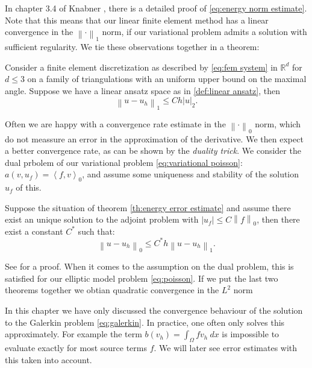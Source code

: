 \documentclass[../Main/main.tex]{subfiles}
\begin{document}
	In chapter 3.4 of Knabner \cite{Knabner}, there is a detailed proof of \eqref{eq:energy norm estimate}.\\
	Note that this means that our linear finite element method has a linear convergence in the $\left \| \cdot \right \|_1$ norm, if our variational problem admits a solution with sufficient regularity. We tie these observations together in a theorem:
	\begin{theorem}\label{th:energy error estimate}
		Consider a finite element discretization as described by \eqref{eq:fem system} in $\mathbb{R}^d$ for $d\leq 3$ on a family of triangulations with an uniform upper bound on the maximal angle. Suppose we have a linear ansatz space as in \ref{def:linear ansatz}, then
		\begin{equation}
			\left \| u-u_h \right \|_{1}\leq C h|u|_{2}.
		\end{equation}
	\end{theorem}
	Often we are happy with a convergence rate estimate in the $\left \| \cdot \right \|_0$ norm, which do not meassure an error in the approximation of the derivative. We then expect a better convergence rate, as can be shown by the \emph{duality trick}. We consider the dual prbolem of our variational problem \eqref{eq:variational poisson}: $a(v,u_f) = \left \langle f,v\right \rangle_0$, and assume some uniqueness and stability of the solution $u_f$ of this. 
	\begin{theorem}[$L^2$ estimate]
		Suppose the situation of theorem \ref{th:energy error estimate} and assume there exist an unique solution to the adjoint problem with $| u_f| \leq C \left \|f \right \|_0$, then there exist a constant $C^*$ such that:
		\begin{equation}
			\left \| u - u_h \right \|_0 \leq C^* h \left \| u- u_h \right \|_1.
		\end{equation}
	\end{theorem}
	See \cite{Knabner} for a proof. When it comes to the assumption on the dual problem, this is satisfied for our elliptic model problem \ref{eq:poisson}. If we put the last two theorems together we obtian quadratic convergence in the $L^2$ norm
	\begin{remark}
		In this chapter we have only discussed the convergence behaviour of the solution to the Galerkin problem \eqref{eq:galerkin}. In practice, one often only solves this approximately. For example the term  $b(v_h)=\int_{\Omega}fv_h \ dx$ is impossible to evaluate exactly for most source terms $f$. We will later see error estimates with this taken into account.
	\end{remark}
\end{document}
